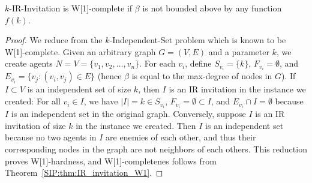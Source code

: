 \begin{theorem} \label{SIP:thm:IR_invitation_large_beta}
	$k$-IR-Invitation is W[1]-complete if $\beta$ is not bounded above by any function $f(k)$. 
\end{theorem}
\begin{proof}
	We reduce from the $k$-Independent-Set problem which is known to be W[1]-complete. 
	Given an arbitrary graph $G = (V, E)$ and a parameter $k$, we create agents $N = V = \{v_1, v_2, \dots, v_n\}$. 
	For each $v_i$, define $S_{v_i} = \{k\}$, $F_{v_i} = \emptyset$, and $E_{v_i} = \{v_j : (v_i, v_j)\in E\}$ (hence $\beta$ is equal to the max-degree of nodes in $G$). 
	If $I \subset V$ is an independent set of size $k$, then $I$ is an IR invitation in the instance we created: For all $v_i \in I$, we have $|I| = k \in S_{v_i}$, $F_{v_i} = \emptyset \subset I$, and $E_{v_i} \cap I = \emptyset$ because $I$ is an independent set in the original graph.
	Conversely, suppose $I$ is an IR invitation of size $k$ in the instance we created. Then $I$ is an independent set because no two agents in $I$ are enemies of each other, and thus their corresponding nodes in the graph are not neighbors of each others. This reduction proves W[1]-hardness, and W[1]-completenes follows from Theorem~\ref{SIP:thm:IR_invitation_W1}.
\end{proof}

